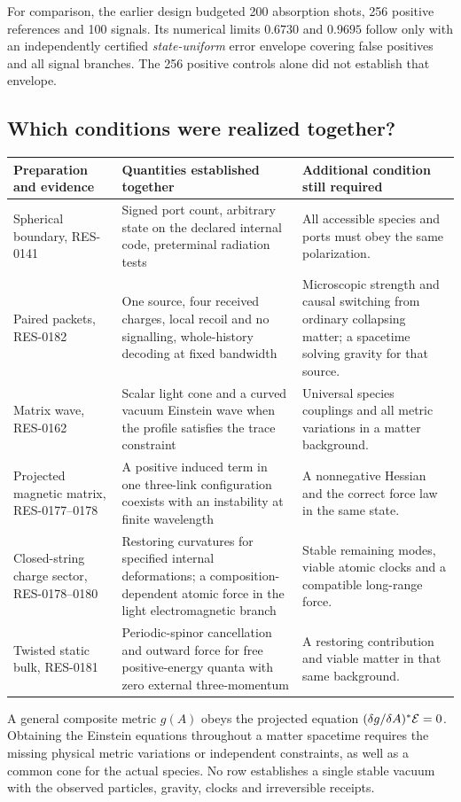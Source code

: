 For comparison, the earlier design budgeted 200 absorption shots, 256 positive references and 100 signals. Its numerical limits \(0.6730\) and \(0.9695\) follow only with an independently certified \emph{state-uniform} error envelope covering false positives and all signal branches. The 256 positive controls alone did not establish that envelope.

\subsection{Which conditions were realized together?}
\begin{center}\small
\begin{tabularx}{\linewidth}{@{}L{.24\linewidth}XX@{}}\toprule
Preparation and evidence & Quantities established together & Additional condition still required\\\midrule
Spherical boundary, RES-0141 & Signed port count, arbitrary state on the declared internal code, preterminal radiation tests & All accessible species and ports must obey the same polarization.\\
Paired packets, RES-0182 & One source, four received charges, local recoil and no signalling, whole-history decoding at fixed bandwidth & Microscopic strength and causal switching from ordinary collapsing matter; a spacetime solving gravity for that source.\\
Matrix wave, RES-0162 & Scalar light cone and a curved vacuum Einstein wave when the profile satisfies the trace constraint & Universal species couplings and all metric variations in a matter background.\\
Projected magnetic matrix, RES-0177--0178 & A positive induced term in one three-link configuration coexists with an instability at finite wavelength & A nonnegative Hessian and the correct force law in the same state.\\
Closed-string charge sector, RES-0178--0180 & Restoring curvatures for specified internal deformations; a composition-dependent atomic force in the light electromagnetic branch & Stable remaining modes, viable atomic clocks and a compatible long-range force.\\
Twisted static bulk, RES-0181 & Periodic-spinor cancellation and outward force for free positive-energy quanta with zero external three-momentum & A restoring contribution and viable matter in that same background.\\
\bottomrule\end{tabularx}
\end{center}
A general composite metric \(g(A)\) obeys the projected equation \((\delta g/\delta A)^*{\cal E}=0\). Obtaining the Einstein equations throughout a matter spacetime requires the missing physical metric variations or independent constraints, as well as a common cone for the actual species. No row establishes a single stable vacuum with the observed particles, gravity, clocks and irreversible receipts.

